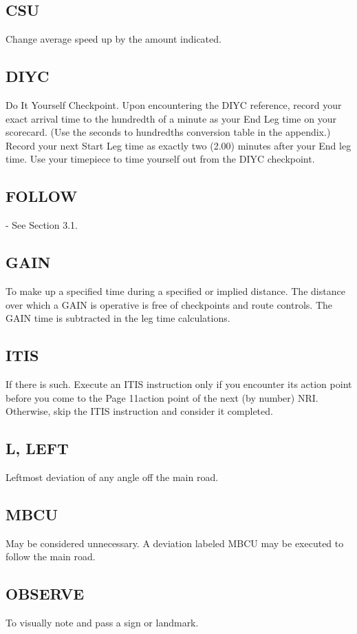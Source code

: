 \subsection{CSU}
Change average speed up by the amount indicated.

\subsection{DIYC}
Do It Yourself Checkpoint. Upon encountering the DIYC reference, record your exact arrival time to the hundredth of a minute as your End Leg time on your scorecard. (Use the seconds to hundredths conversion table in the appendix.) Record your next Start Leg time as exactly two (2.00) minutes after your End leg time. Use your timepiece to time yourself out from the DIYC checkpoint.

\subsection{FOLLOW} - See Section 3.1.

\subsection{GAIN}
To make up a specified time during a specified or implied distance. The distance over which a GAIN is operative is free of checkpoints and route controls. The GAIN time is subtracted in the leg time calculations.

\subsection{ITIS}
If there is such. Execute an ITIS instruction only if you encounter its action point before you come to the Page 11action point of the next (by number) NRI. Otherwise, skip the ITIS instruction and consider it completed.

\subsection{L, LEFT}
Leftmost deviation of any angle off the main road.

\subsection{MBCU}
May be considered unnecessary. A deviation labeled MBCU may be executed to follow the main road.

\subsection{OBSERVE}
To visually note and pass a sign or landmark.


